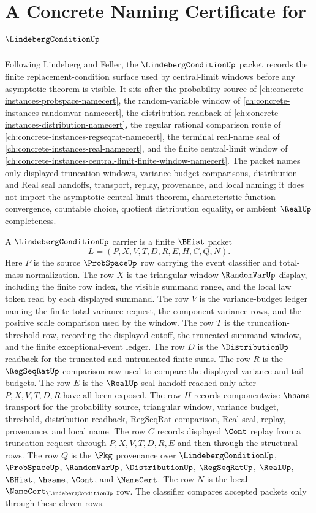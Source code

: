 \chapter{A Concrete Naming Certificate for $\LindebergConditionUp$}
\label{ch:concrete-instances-lindeberg-condition-namecert}

Following Lindeberg and Feller, the $\LindebergConditionUp$ packet records the finite replacement-condition surface used by central-limit windows before any asymptotic theorem is visible. It sits after the probability source of \autoref{ch:concrete-instances-probspace-namecert}, the random-variable window of \autoref{ch:concrete-instances-randomvar-namecert}, the distribution readback of \autoref{ch:concrete-instances-distribution-namecert}, the regular rational comparison route of \autoref{ch:concrete-instances-regseqrat-namecert}, the terminal real-name seal of \autoref{ch:concrete-instances-real-namecert}, and the finite central-limit window of \autoref{ch:concrete-instances-central-limit-finite-window-namecert}. The packet names only displayed truncation windows, variance-budget comparisons, distribution and Real seal handoffs, transport, replay, provenance, and local naming; it does not import the asymptotic central limit theorem, characteristic-function convergence, countable choice, quotient distribution equality, or ambient $\RealUp$ completeness.

\begin{definition}
\label{def:lindeberg-condition-carrier}
A $\LindebergConditionUp$ carrier is a finite $\BHist$ packet
$$
L=(P,X,V,T,D,R,E,H,C,Q,N).
$$
Here $P$ is the source $\ProbSpaceUp$ row carrying the event classifier and total-mass normalization. The row $X$ is the triangular-window $\RandomVarUp$ display, including the finite row index, the visible summand range, and the local law token read by each displayed summand. The row $V$ is the variance-budget ledger naming the finite total variance request, the component variance rows, and the positive scale comparison used by the window. The row $T$ is the truncation-threshold row, recording the displayed cutoff, the truncated summand window, and the finite exceptional-event ledger. The row $D$ is the $\DistributionUp$ readback for the truncated and untruncated finite sums. The row $R$ is the $\RegSeqRatUp$ comparison row used to compare the displayed variance and tail budgets. The row $E$ is the $\RealUp$ seal handoff reached only after $P,X,V,T,D,R$ have all been exposed. The row $H$ records componentwise $\hsame$ transport for the probability source, triangular window, variance budget, threshold, distribution readback, RegSeqRat comparison, Real seal, replay, provenance, and local name. The row $C$ records displayed $\Cont$ replay from a truncation request through $P,X,V,T,D,R,E$ and then through the structural rows. The row $Q$ is the $\Pkg$ provenance over $\LindebergConditionUp$, $\ProbSpaceUp$, $\RandomVarUp$, $\DistributionUp$, $\RegSeqRatUp$, $\RealUp$, $\BHist$, $\hsame$, $\Cont$, and $\NameCert$. The row $N$ is the local $\NameCert_{\LindebergConditionUp}$ row. The classifier compares accepted packets only through these eleven rows.
\end{definition}

